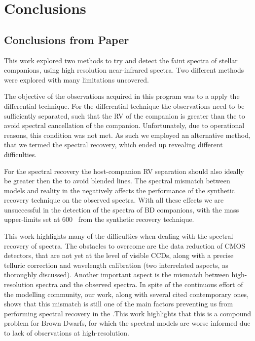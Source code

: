
\chapter{Conclusions}  %

\label{cha:conclusions}


\section{Conclusions from Paper}
\label{sec:conclusions}

This work explored two methods to try and detect the faint spectra of stellar companions, using high resolution near-infrared spectra.
Two different methods were explored with many limitations uncovered.

The objective of the observations acquired in this program was to a apply the differential technique.
For the differential technique the observations need to be sufficiently separated, such that the {RV} of the companion is greater than the {\fwhm} to avoid spectral cancellation of the companion.
Unfortunately, due to operational reasons, this condition was not met.
As such we employed an alternative method, that we termed the spectral recovery, which ended up revealing different difficulties.

For the spectral recovery the host-companion {RV} separation should also ideally be greater then the {\fwhm} to avoid blended lines.
The spectral mismatch between models and reality in the \nir{}negatively affects the performance of the synthetic recovery technique on the observed spectra.
With all these effects we are unsuccessful in the detection of the \nir{}spectra of {BD} companions, with the mass upper-limits set at 600~\Mjup{} from the synthetic recovery technique.

This work highlights many of the difficulties when dealing with the spectral recovery of \nir{}spectra.
The obstacles to overcome are the data reduction of \nir{}CMOS detectors, that are not yet at the level of visible CCDs, along with a precise telluric correction and wavelength calibration (two interrelated aspects, as thoroughly discussed).
Another important aspect is the mismatch between \nir{}high-resolution spectra and the observed spectra.
In spite of the continuous effort of the modelling community, our work, along with several cited contemporary ones, shows that this mismatch is still one of the main factors preventing us from performing spectral recovery in the \nir{}.\@ This work highlights that this is a compound problem for Brown Dwarfs, for which the spectral models are worse informed due to lack of observations at high-resolution.

